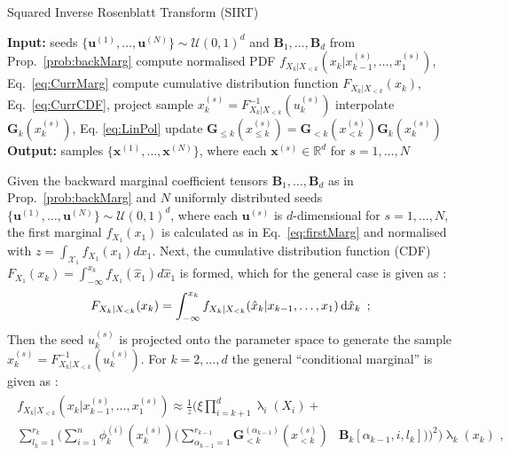 \begin{algorithm}[!th]
	\caption{Squared Inverse Rosenblatt Transform (SIRT)}
	\begin{algorithmic}[1]
		\STATE \textbf{Input:} seeds $\{ \bm{u}^{(1)},\dots, \bm{u}^{(N)} \} \sim \mathcal{U}(0,1)^d $ and $\bm{B}_1 , \dots,\bm{B}_d$  from Prop.~\ref{prob:backMarg}
		\STATE compute normalised PDF $ f_{X_k|X_{<k}}(x_k|x^{(s)}_{k-1},\dots,x^{(s)}_1)$, Eq.~\ref{eq:CurrMarg}
		\STATE compute cumulative distribution function $F_{X_k|X_{<k}}(x_k)$, Eq.~\ref{eq:CurrCDF},
		\STATE project sample $x^{(s)}_k = F_{X_k|X_{<k}}^{-1}(u^{(s)}_k)$
		\STATE interpolate $\bm{G}_k(x^{(s)}_k)$, Eq. \ref{eq:LinPol}
		\STATE update $\bm{G}_{\leq k}(x^{(s)}_{\leq k}) = \bm{G}_{<k}(x^{(s)}_{<k}) \bm{G}_k(x^{(s)}_k)$
		\ENDFOR
		\ENDFOR
		\STATE \textbf{Output:} samples $\{ \bm{x}^{(1)},\dots, \bm{x}^{(N)} \} $, where each $\bm{x}^{(s)} \in \mathbb{R}^d$ for $s = 1, \dots, N$
	\end{algorithmic}
	\label{alg:SIRT}
\end{algorithm}
Given the backward marginal coefficient tensors $\bm{B}_1 , \dots,\bm{B}_d$ as in Prop.~\ref{prob:backMarg} and $N$ uniformly distributed seeds $\{ \bm{u}^{(1)},\dots, \bm{u}^{(N)} \} \sim \mathcal{U}(0,1)^d $, where each $\bm{u}^{(s)}$ is $d$-dimensional for $s = 1, \dots, N$, the first marginal $f_{X_1}(x_1)$ is calculated as in Eq.~\ref{eq:firstMarg} and normalised with $z = \int_{\mathcal{X}_1} f_{X_1}(x_1) d x_1$. 
Next, the cumulative distribution function (CDF) $F_{X_1}(x_k) = \int^{x_k}_{-\infty} f_{X_1}(\hat{x}_1) d \hat{x}_1$ is formed, which for the general case is given as \cite[Eq. 17]{cui2022deep}:
\begin{align}
	F_{X_k|X_{<k}}(x_k) = \int_{-\infty}^{x_k} f_{X_k|X_{<k}}(\hat{x}_k|x_{k-1},\dots,x_1) \mathop{}\!\mathrm{d} \hat{x}_k  \, \,  \, ;
	\label{eq:CurrCDF}
\end{align}
Then the seed $u^{(s)}_k$ is projected onto the parameter space to generate the sample $x^{(s)}_k = F_{X_k|X_{<k}}^{-1}(u^{(s)}_k)$. %
For $k = 2, \dots,d$ the general ``conditional marginal'' is given as \cite[Eq.~31]{cui2022deep}:
\begin{align}\begin{split} 
		f_{X_k|X_{<k}}(x_k|x^{(s)}_{k-1},\dots,x^{(s)}_1) \approx \frac{1}{z}
		\Bigg( 
		\xi \prod_{i=k+1}^{d} \uplambda_i(X_i) +&  \\
		\sum_{l_{k} = 1}^{r_{k}} \Bigg( \sum_{i = 1}^{n}  \phi^{(i)}_k(x^{(s)}_k) \bigg( \sum_{\alpha_{k-1} = 1}^{r_{k-1}} \bm{G}^{(\alpha_{k-1})}_{<k}(x^{(s)}_{<k}) &\bm{B}_k[\alpha_{k-1},i,l_k] \bigg) \Bigg)^2 \Bigg) \uplambda_k(x_k) \, \,  ,
	\end{split} 
	\label{eq:CurrMarg} 
\end{align}
